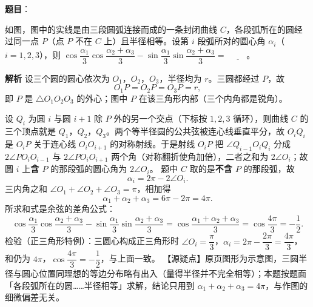 \begin{answer}

\textbf{题目}：

如图，图中的实线是由三段圆弧连接而成的一条封闭曲线 $C$，各段弧所在的圆经过同一点 $P$（点 $P$ 不在 $C$ 上）且半径相等。设第 $i$ 段弧所对的圆心角 $\alpha_i$（$i=1,2,3$），则 $\cos\dfrac{\alpha_1}{3}\cos\dfrac{\alpha_2+\alpha_3}{3}-\sin\dfrac{\alpha_1}{3}\sin\dfrac{\alpha_2+\alpha_3}{3}=$ $\underline{\qquad}$。
\nopagebreak[4]
\begin{center}\end{center}
\nopagebreak[4]
\textbf{解析}
设三个圆的圆心依次为 $O_1$，$O_2$，$O_3$，半径均为 $r$。三圆都经过 $P$，故
\nopagebreak[4]
\[O_1P=O_2P=O_3P=r,\]
即 $P$ 是 $\triangle O_1O_2O_3$ 的外心；图中 $P$ 在该三角形内部（三个内角都是锐角）。

设 $Q_i$ 为圆 $i$ 与圆 $i+1$ 除 $P$ 外的另一个交点（下标按 $1,2,3$ 循环），则曲线 $C$ 的三个顶点就是 $Q_1$，$Q_2$，$Q_3$。两个等半径圆的公共弦被连心线垂直平分，故 $O_iQ_i$ 是 $O_iP$ 关于连心线 $O_iO_{i+1}$ 的对称射线。于是射线 $O_iP$ 把 $\angle Q_{i-1}O_iQ_i$ 分成 $2\angle PO_iO_{i-1}$ 与 $2\angle PO_iO_{i+1}$ 两个角（对称翻折使角加倍），二者之和为 $2\angle O_i$；故圆 $i$ 上\textbf{含 $P$} 的那段弧的圆心角为 $2\angle O_i$。
题中 $C$ 取的是\textbf{不含 $P$} 的那段弧，故
\nopagebreak[4]
\[\alpha_i=2\pi-2\angle O_i.\]
三内角之和 $\angle O_1+\angle O_2+\angle O_3=\pi$，相加得
\nopagebreak[4]
\[\alpha_1+\alpha_2+\alpha_3=6\pi-2\pi=4\pi.\]
所求和式是余弦的差角公式：
\nopagebreak[4]
\[\cos\frac{\alpha_1}{3}\cos\frac{\alpha_2+\alpha_3}{3}-\sin\frac{\alpha_1}{3}\sin\frac{\alpha_2+\alpha_3}{3}=\cos\frac{\alpha_1+\alpha_2+\alpha_3}{3}=\cos\frac{4\pi}{3}=-\frac12.\]
检验（正三角形特例）：三圆心构成正三角形时 $\angle O_i=\dfrac{\pi}{3}$，$\alpha_i=2\pi-\dfrac{2\pi}{3}=\dfrac{4\pi}{3}$，和仍为 $4\pi$，$\cos\dfrac{4\pi}{3}=-\dfrac12$，与上面一致。
【源疑点】原页图形为示意图，三圆半径与圆心位置同理想的等边分布略有出入（量得半径并不完全相等）；本题按题面「各段弧所在的圆……半径相等」求解，结论只用到 $\alpha_1+\alpha_2+\alpha_3=4\pi$，与作图的细微偏差无关。


\end{answer}
